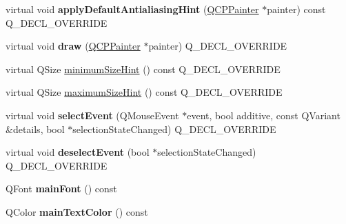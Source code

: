 \begin{DoxyCompactItemize}
\mbox{\label{class_q_c_p_text_element_ae9ab69dcb7bb2b13e9128c20748f668d}} 
virtual void {\bfseries apply\+Default\+Antialiasing\+Hint} (\hyperlink{class_q_c_p_painter}{Q\+C\+P\+Painter} $\ast$painter) const Q\+\_\+\+D\+E\+C\+L\+\_\+\+O\+V\+E\+R\+R\+I\+DE
\item 
\mbox{\label{class_q_c_p_text_element_a6217f76da5c4dea768e40627ab242973}} 
virtual void {\bfseries draw} (\hyperlink{class_q_c_p_painter}{Q\+C\+P\+Painter} $\ast$painter) Q\+\_\+\+D\+E\+C\+L\+\_\+\+O\+V\+E\+R\+R\+I\+DE
\item 
virtual Q\+Size \hyperlink{class_q_c_p_text_element_a28c1113007c8990bf2c1a235b24381ef}{minimum\+Size\+Hint} () const Q\+\_\+\+D\+E\+C\+L\+\_\+\+O\+V\+E\+R\+R\+I\+DE
\item 
virtual Q\+Size \hyperlink{class_q_c_p_text_element_a174551b248c8960d1b250bbe04e1b20c}{maximum\+Size\+Hint} () const Q\+\_\+\+D\+E\+C\+L\+\_\+\+O\+V\+E\+R\+R\+I\+DE
\item 
\mbox{\label{class_q_c_p_text_element_a281e7b84450205c1a1d2a741cde91677}} 
virtual void {\bfseries select\+Event} (Q\+Mouse\+Event $\ast$event, bool additive, const Q\+Variant \&details, bool $\ast$selection\+State\+Changed) Q\+\_\+\+D\+E\+C\+L\+\_\+\+O\+V\+E\+R\+R\+I\+DE
\item 
\mbox{\label{class_q_c_p_text_element_aef3ac95fabd9475abcc9d9f25516fe23}} 
virtual void {\bfseries deselect\+Event} (bool $\ast$selection\+State\+Changed) Q\+\_\+\+D\+E\+C\+L\+\_\+\+O\+V\+E\+R\+R\+I\+DE
\item 
\mbox{\label{class_q_c_p_text_element_ae236bd398e52939f2de2b70e5e2ba611}} 
Q\+Font {\bfseries main\+Font} () const
\item 
\mbox{\label{class_q_c_p_text_element_a63510789e31db34362de97d78e9e7866}} 
Q\+Color {\bfseries main\+Text\+Color} () const
\end{DoxyCompactItemize}
